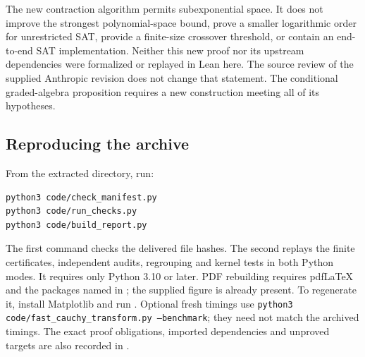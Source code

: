 The new contraction algorithm permits subexponential space. It does not
improve the strongest polynomial-space bound, prove a smaller logarithmic
order for unrestricted SAT, provide a finite-size crossover threshold,
or contain an end-to-end SAT implementation. Neither this new proof nor
its upstream dependencies were formalized or replayed in Lean here. The
source review of the supplied Anthropic revision does not change that
statement. The conditional graded-algebra proposition requires a new
construction meeting all of its hypotheses.

\subsection{Reproducing the archive}
From the extracted directory, run:
\begin{lstlisting}
python3 code/check_manifest.py
python3 code/run_checks.py
python3 code/build_report.py
\end{lstlisting}
The first command checks the delivered file hashes. The second replays
the finite certificates, independent audits, regrouping and kernel tests
in both Python modes. It requires only Python 3.10 or later. PDF rebuilding
requires pdfLaTeX and the packages named in ; the supplied
figure is already present. To regenerate it, install Matplotlib and run
. Optional fresh timings use
\texttt{python3 code/fast\_cauchy\_transform.py --benchmark}; they need not
match the archived timings. The exact proof obligations, imported
dependencies and unproved targets are also recorded in
.
